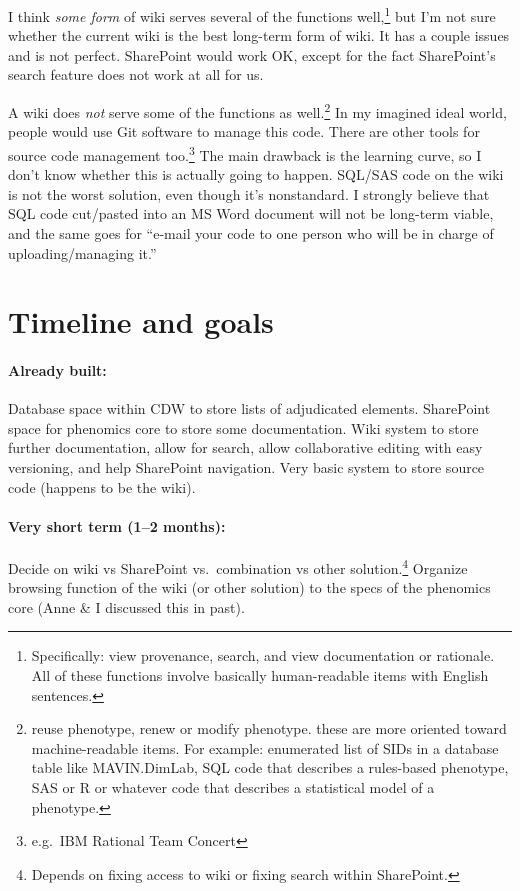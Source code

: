 \documentclass{tufte-handout}
\begin{document}
I think \emph{some form} of wiki serves several of the functions
well,\footnote{Specifically: view provenance, search, and view
  documentation or rationale. All of these functions involve basically
  human-readable items with English sentences.} but I'm not sure
whether the current wiki is the best long-term form of wiki. It has a
couple issues and is not perfect. SharePoint would work OK, except for
the fact SharePoint's search feature does not work at all for us.

A wiki does \emph{not} serve some of the functions as
well.\footnote{reuse phenotype, renew or modify phenotype. these are
  more oriented toward machine-readable items. For example: enumerated
  list of SIDs in a database table like MAVIN.DimLab, SQL code that
  describes a rules-based phenotype, SAS or R or whatever code that
  describes a statistical model of a phenotype.} In my imagined ideal
world, people would use Git software to manage this code. There are
other tools for source code management too.\footnote{e.g.\ IBM
  Rational Team Concert} The main drawback is the learning curve, so I
don't know whether this is actually going to happen. SQL/SAS code on
the wiki is not the worst solution, even though it's nonstandard. I
strongly believe that SQL code cut/pasted into an MS Word document
will not be long-term viable, and the same goes for ``e-mail your code
to one person who will be in charge of uploading/managing it.''

\section{Timeline and goals}

\paragraph{Already built:} Database space within CDW to store lists
of adjudicated elements. SharePoint space for phenomics core to store
some documentation. Wiki system to store further documentation, allow
for search, allow collaborative editing with easy versioning, and help
SharePoint navigation. Very basic system to store source code (happens
to be the wiki).

\paragraph{Very short term (1--2 months):} Decide on wiki vs SharePoint
vs.\ combination vs other solution.\footnote{Depends on fixing access
  to wiki or fixing search within SharePoint.} Organize browsing
function of the wiki (or other solution) to the specs of the phenomics
core (Anne \& I discussed this in past).
\end{document}
